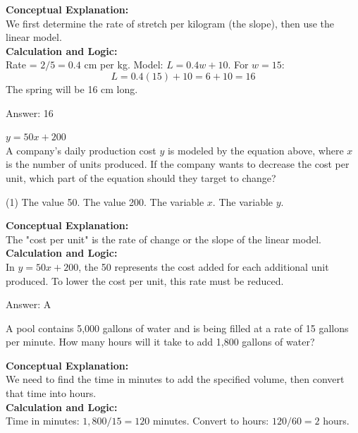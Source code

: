 \documentclass[11pt,paper=a4,answers]{exam}
\begin{document}
\begin{questions}
\begin{solution}
\textbf{Conceptual Explanation:} \\
We first determine the rate of stretch per kilogram (the slope), then use the linear model.
\\[10pt]
\textbf{Calculation and Logic:} \\
Rate = $2 / 5 = 0.4$ cm per kg.
Model: $L = 0.4w + 10$.
For $w = 15$:
\[L = 0.4(15) + 10 = 6 + 10 = 16\]
The spring will be 16 cm long.

\vspace{15pt}
Answer: \colorbox{yellow!100}{16}
\end{solution}

\question
$y = 50x + 200$ \\
A company's daily production cost $y$ is modeled by the equation above, where $x$ is the number of units produced. If the company wants to decrease the cost per unit, which part of the equation should they target to change?
\begin{tasks}(1)
    \task The value 50.
    \task The value 200.
    \task The variable $x$.
    \task The variable $y$.
\end{tasks}

\begin{solution}
\textbf{Conceptual Explanation:} \\
The "cost per unit" is the rate of change or the slope of the linear model.
\\[10pt]
\textbf{Calculation and Logic:} \\
In $y = 50x + 200$, the 50 represents the cost added for each additional unit produced. To lower the cost per unit, this rate must be reduced.

\vspace{15pt}
Answer: \colorbox{yellow!100}{A}
\end{solution}

\question
A pool contains 5,000 gallons of water and is being filled at a rate of 15 gallons per minute. How many hours will it take to add 1,800 gallons of water?

\begin{solution}
\textbf{Conceptual Explanation:} \\
We need to find the time in minutes to add the specified volume, then convert that time into hours.
\\[10pt]
\textbf{Calculation and Logic:} \\
Time in minutes: $1,800 / 15 = 120$ minutes.
Convert to hours: $120 / 60 = 2$ hours.


\end{solution}
\end{questions}
\end{document}
